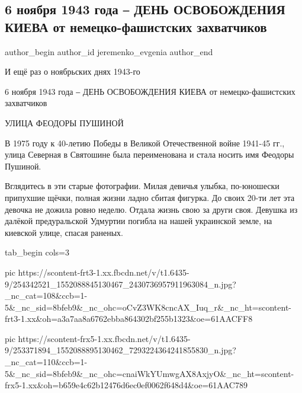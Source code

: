  
 
 
 
 
 
\subsection{6 ноября 1943 года ‒ ДЕНЬ ОСВОБОЖДЕНИЯ КИЕВА от немецко-фашистских захватчиков}
\label{sec:06_11_2021.fb.jeremenko_evgenia.1.den_osvobozhdenie_ulica_pushinoj}
 
\ifcmt
 author_begin
   author_id jeremenko_evgenia
 author_end
\fi

И ещё раз о ноябрьских днях 1943-го

6 ноября 1943 года ‒ ДЕНЬ ОСВОБОЖДЕНИЯ КИЕВА от немецко-фашистских захватчиков

УЛИЦА ФЕОДОРЫ ПУШИНОЙ

В 1975 году к 40-летию Победы в Великой Отечественной войне 1941-45 гг., улица
Северная в Святошине была переименована и стала носить имя Феодоры Пушиной. 

Вглядитесь в эти старые фотографии. Милая девичья улыбка, по-юношески припухшие
щёчки, полная жизни ладно сбитая фигурка. До своих 20-ти лет эта девочка не
дожила ровно неделю. Отдала жизнь свою за други своя. Девушка из далёкой
предуральской Удмуртии погибла на нашей украинской земле, на киевской улице,
спасая раненых.

\ifcmt
  tab_begin cols=3

     pic https://scontent-frt3-1.xx.fbcdn.net/v/t1.6435-9/254342521_1552088845130467_2430736957911963084_n.jpg?_nc_cat=108&ccb=1-5&_nc_sid=8bfeb9&_nc_ohc=oCvZ3WK8cncAX_Iuq_r&_nc_ht=scontent-frt3-1.xx&oh=a3a7aa8a6762ebba864302bf255b1323&oe=61AACFF8

     pic https://scontent-frx5-1.xx.fbcdn.net/v/t1.6435-9/253371894_1552088895130462_7293224364241855830_n.jpg?_nc_cat=110&ccb=1-5&_nc_sid=8bfeb9&_nc_ohc=cnaiWkYUmwgAX8AxjyO&_nc_ht=scontent-frx5-1.xx&oh=b659e4c62b12476d6ec0ef0062f648d4&oe=61AAC789

